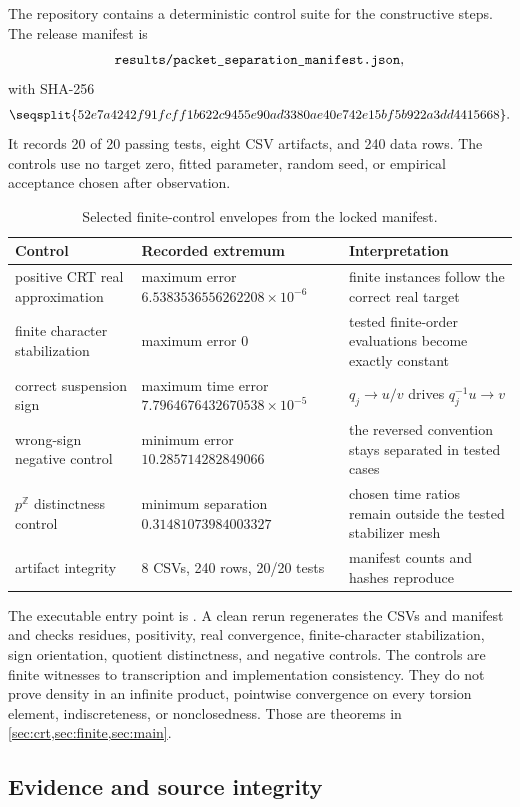 \documentclass[11pt]{article}
\theoremstyle{definition}
\newcommand{\Z}{\mathbb{Z}}
\newcommand{\coord}[1]{\texttt{\detokenize{#1}}}
\begin{document}
The repository contains a deterministic control suite for the constructive steps.  The release manifest is
\[
 \coord{results/packet_separation_manifest.json},
\]
with SHA-256
\[
 \seqsplit{52e7a4242f91fcff1b622c9455e90ad3380ae40e742e15bf5b922a3dd4415668}.
\]
It records 20 of 20 passing tests, eight CSV artifacts, and 240 data rows.  The controls use no target zero, fitted parameter, random seed, or empirical acceptance chosen after observation.

\begin{table}[htbp]
\centering\small
\caption{Selected finite-control envelopes from the locked manifest.}\label{tab:controls}
\begin{tabularx}{\textwidth}{Y P{0.23\textwidth} Y}
\toprule
Control & Recorded extremum & Interpretation \\
\midrule
positive CRT real approximation & maximum error \(6.5383536556262208\times10^{-6}\) & finite instances follow the correct real target\\
finite character stabilization & maximum error \(0\) & tested finite-order evaluations become exactly constant\\
correct suspension sign & maximum time error \(7.7964676432670538\times10^{-5}\) & \(q_j\to u/v\) drives \(q_j^{-1}u\to v\)\\
wrong-sign negative control & minimum error \(10.285714282849066\) & the reversed convention stays separated in tested cases\\
\(p^{\Z}\) distinctness control & minimum separation \(0.31481073984003327\) & chosen time ratios remain outside the tested stabilizer mesh\\
artifact integrity & 8 CSVs, 240 rows, 20/20 tests & manifest counts and hashes reproduce\\
\bottomrule
\end{tabularx}
\end{table}

The executable entry point is \coord{experiments/reproduce.sh}.  A clean rerun regenerates the CSVs and manifest and checks residues, positivity, real convergence, finite-character stabilization, sign orientation, quotient distinctness, and negative controls.  The controls are finite witnesses to transcription and implementation consistency.  They do not prove density in an infinite product, pointwise convergence on every torsion element, indiscreteness, or nonclosedness.  Those are theorems in \cref{sec:crt,sec:finite,sec:main}.

\subsection{Evidence and source integrity}
\end{document}
